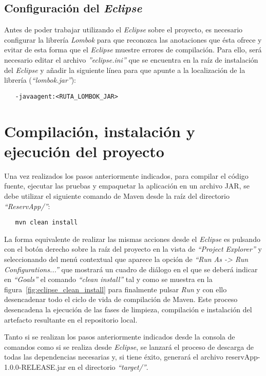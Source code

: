 \subsection{Configuración del \textit{Eclipse}}
Antes de poder trabajar utilizando el \textit{Eclipse} sobre el proyecto, es necesario configurar la librería \textit{Lombok} para que reconozca las anotaciones que ésta ofrece y evitar de esta forma que el \textit{Eclipse} muestre errores de compilación. Para ello, será necesario editar el archivo \emph{''eclipse.ini''} que se encuentra en la raíz de instalación del \textit{Eclipse} y añadir la siguiente línea para que apunte a la localización de la librería (\emph{``lombok.jar''}):
\begin{verbatim}
   -javaagent:<RUTA_LOMBOK_JAR>
\end{verbatim}

\section{Compilación, instalación y ejecución del proyecto}

Una vez realizados los pasos anteriormente indicados, para compilar el código fuente, ejecutar las pruebas y empaquetar la aplicación en un archivo JAR, se debe utilizar el siguiente comando de Maven desde la raíz del directorio \emph{``ReservApp/''}:
\begin{verbatim}
   mvn clean install
\end{verbatim}

La forma equivalente de realizar las mismas acciones desde el \textit{Eclipse} es pulsando con el botón derecho sobre la raíz del proyecto en la vista de \emph{``Project Explorer''} y seleccionando del menú contextual que aparece la opción de \emph{``Run As -> Run Configurations...''} que mostrará un cuadro de diálogo en el que se deberá indicar en \emph{``Goals''} el comando \emph{``clean install''} tal y como se muestra en la figura~\ref{fig:eclipse_clean_install} para finalmente pulsar \emph{Run} y con ello desencadenar todo el ciclo de vida de compilación de Maven. Este proceso desencadena la ejecución de las fases de limpieza, compilación e instalación del artefacto resultante en el repositorio local.


Tanto si se realizan los pasos anteriormente indicados desde la consola de comandos como si se realiza desde \textit{Eclipse}, se lanzará el proceso de descarga de todas las dependencias necesarias y, si tiene éxito, generará el archivo reservApp-1.0.0-RELEASE.jar en el directorio \emph{``target/''}.

